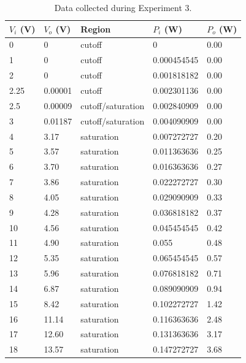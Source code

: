 \documentclass{report}
\begin{document}
\begin{table}[H]
	\caption{Data collected during Experiment 3.}
	\centering
	\begin{tabular}{@{}lllll@{}}
		\toprule
		$V_i$ (V) & $V_o$ (V) & Region            & $P_i$ (W)    & $P_o$ (W) \\ \midrule
		0        & 0        & cutoff            & 0           & 0.00     \\
		1        & 0        & cutoff            & 0.000454545 & 0.00     \\
		2        & 0        & cutoff            & 0.001818182 & 0.00     \\
		2.25     & 0.00001  & cutoff            & 0.002301136 & 0.00     \\
		2.5      & 0.00009  & cutoff/saturation & 0.002840909 & 0.00     \\
		3        & 0.01187  & cutoff/saturation & 0.004090909 & 0.00     \\
		4        & 3.17     & saturation        & 0.007272727 & 0.20     \\
		5        & 3.57     & saturation        & 0.011363636 & 0.25     \\
		6        & 3.70     & saturation        & 0.016363636 & 0.27     \\
		7        & 3.86     & saturation        & 0.022272727 & 0.30     \\
		8        & 4.05     & saturation        & 0.029090909 & 0.33     \\
		9        & 4.28     & saturation        & 0.036818182 & 0.37     \\
		10       & 4.56     & saturation        & 0.045454545 & 0.42     \\
		11       & 4.90     & saturation        & 0.055       & 0.48     \\
		12       & 5.35     & saturation        & 0.065454545 & 0.57     \\
		13       & 5.96     & saturation        & 0.076818182 & 0.71     \\
		14       & 6.87     & saturation        & 0.089090909 & 0.94     \\
		15       & 8.42     & saturation        & 0.102272727 & 1.42     \\
		16       & 11.14    & saturation        & 0.116363636 & 2.48     \\
		17       & 12.60    & saturation        & 0.131363636 & 3.17     \\
		18       & 13.57    & saturation        & 0.147272727 & 3.68     \\

\end{tabular}
\end{table}
\end{document}

